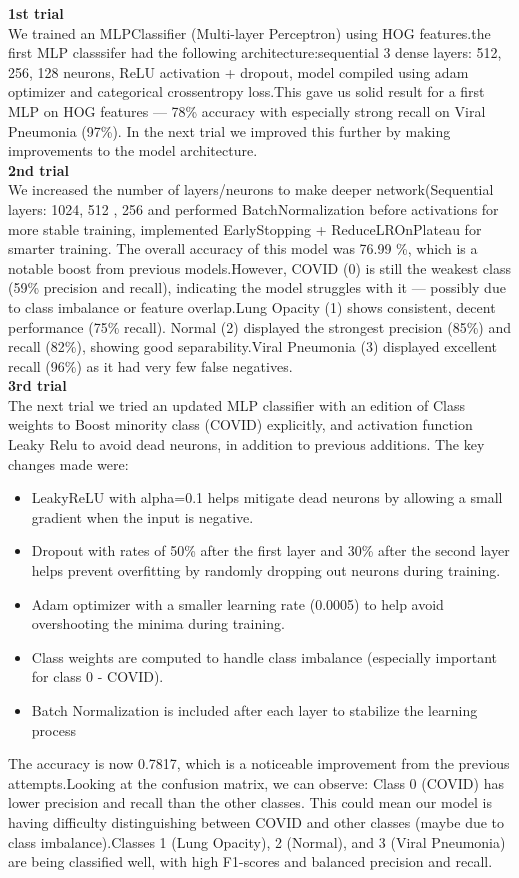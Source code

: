 \documentclass{article}
\begin{document}
\textbf{1st trial }\\We trained an MLPClassifier (Multi-layer Perceptron) using HOG features.the first MLP classsifer had the following architecture:sequential 3 dense layers: 512, 256, 128 neurons, ReLU activation + dropout, model compiled using adam optimizer and categorical crossentropy loss.This gave us solid result for a first MLP on HOG features — 78\% accuracy with especially strong recall on Viral Pneumonia (97\%).
In the next trial we improved this further by making improvements to the model architecture.\\

\textbf{2nd trial }\\
We increased the number of layers/neurons to make deeper network(Sequential layers: 1024, 512 , 256
and performed BatchNormalization before activations for more stable training, implemented EarlyStopping + ReduceLROnPlateau for smarter training.
The overall accuracy of this model was 76.99 \%, which is a notable boost from previous models.However, COVID (0) is still the weakest class (59\% precision and recall), indicating the model struggles with it — possibly due to class imbalance or feature overlap.Lung Opacity (1) shows consistent, decent performance (75\% recall). Normal (2) displayed the strongest precision (85\%) and recall (82\%), showing good separability.Viral Pneumonia (3) displayed excellent recall (96\%) as it had very few false negatives.\\

\textbf{3rd trial }\\
The next trial  we tried an updated MLP classifier with an edition of Class weights to Boost minority class (COVID) explicitly, and activation function Leaky Relu to avoid dead neurons, in addition to previous additions. The key changes made were:
 \begin{itemize}
     \item LeakyReLU with alpha=0.1 helps mitigate dead neurons by allowing a small gradient when the input is negative.
     \item Dropout with rates of 50\% after the first layer and 30\% after the second layer helps prevent overfitting by randomly dropping out neurons during training.
     \item Adam optimizer with a smaller learning rate (0.0005) to help avoid overshooting the minima during training.
     \item Class weights are computed to handle class imbalance (especially important for class 0 - COVID).
     \item Batch Normalization is included after each layer to stabilize the learning process
\end{itemize}
The accuracy is now 0.7817, which is a noticeable improvement from the previous attempts.Looking at the confusion matrix, we can observe: Class 0 (COVID) has lower precision and recall than the other classes. This could mean our model is having difficulty distinguishing between COVID and other classes (maybe due to class imbalance).Classes 1 (Lung Opacity), 2 (Normal), and 3 (Viral Pneumonia) are being classified well, with high F1-scores and balanced precision and recall.\\
\end{document}
